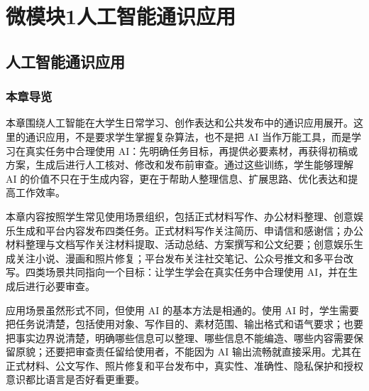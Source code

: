 \part*{微模块1\quad 人工智能通识应用}


\setcounter{chapter}{3}

\chapter{人工智能通识应用}

\renewcommand{\thetable}{\thechapter-\arabic{table}}
\captionsetup[table]{labelformat=empty,labelsep=none}

\newcommand{\chaptertablelabel}{{\xeCJKsetup{CJKecglue={}}表\thetable}}

\section*{本章导览}

本章围绕人工智能在大学生日常学习、创作表达和公共发布中的通识应用展开。这里的通识应用，不是要求学生掌握复杂算法，也不是把 AI 当作万能工具，而是学习在真实任务中合理使用 AI：先明确任务目标，再提供必要素材，再获得初稿或方案，生成后进行人工核对、修改和发布前审查。通过这些训练，学生能够理解 AI 的价值不只在于生成内容，更在于帮助人整理信息、扩展思路、优化表达和提高工作效率。

本章内容按照学生常见使用场景组织，包括正式材料写作、办公材料整理、创意娱乐生成和平台内容发布四类任务。正式材料写作关注简历、申请信和感谢信；办公材料整理与文档写作关注材料提取、活动总结、方案撰写和公文纪要；创意娱乐生成关注小说、漫画和照片修复；平台发布关注社交笔记、公众号推文和多平台改写。四类场景共同指向一个目标：让学生学会在真实任务中合理使用 AI，并在生成后进行必要审查。

应用场景虽然形式不同，但使用 AI 的基本方法是相通的。使用 AI 时，学生需要把任务说清楚，包括使用对象、写作目的、素材范围、输出格式和语气要求；也要把事实边界说清楚，明确哪些信息可以整理、哪些信息不能编造、哪些内容需要保留原貌；还要把审查责任留给使用者，不能因为 AI 输出流畅就直接采用。尤其在正式材料、公文写作、照片修复和平台发布中，真实性、准确性、隐私保护和授权意识都比语言是否好看更重要。

